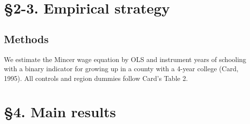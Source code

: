 \section{§2-3. Empirical strategy}

\subsection*{Methods}
We estimate the Mincer wage equation by OLS and instrument years of schooling with a binary indicator for growing up in a county with a 4-year college (Card, 1995). All controls and region dummies follow Card's Table 2.

\section{§4. Main results}

